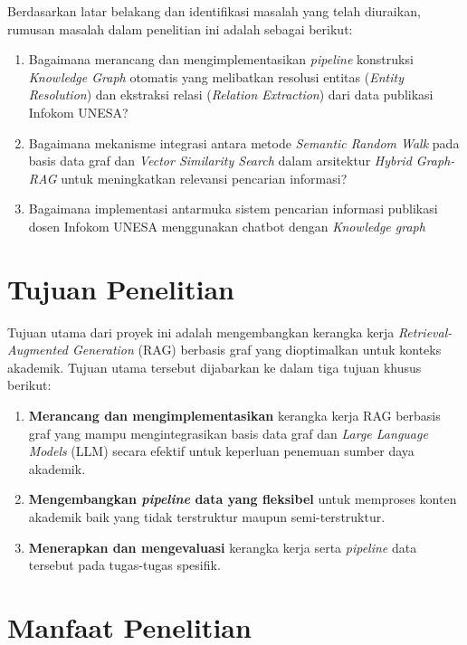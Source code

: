 Berdasarkan latar belakang dan identifikasi masalah yang telah diuraikan, rumusan masalah dalam penelitian ini adalah sebagai berikut:

\begin{enumerate}
    \item Bagaimana merancang dan mengimplementasikan \textit{pipeline} konstruksi \textit{Knowledge Graph} otomatis yang melibatkan resolusi entitas (\textit{Entity Resolution}) dan ekstraksi relasi (\textit{Relation Extraction}) dari data publikasi Infokom UNESA?
    
    \item Bagaimana mekanisme integrasi antara metode \textit{Semantic Random Walk} pada basis data graf dan \textit{Vector Similarity Search} dalam arsitektur \textit{Hybrid Graph-RAG} untuk meningkatkan relevansi pencarian informasi?

    \item Bagaimana implementasi antarmuka sistem pencarian informasi publikasi dosen Infokom UNESA menggunakan chatbot dengan \textit{Knowledge graph}  
\end{enumerate}


\section{Tujuan Penelitian}

Tujuan utama dari proyek ini adalah mengembangkan kerangka kerja \textit{Retrieval-Augmented Generation} (RAG) berbasis graf yang dioptimalkan untuk konteks akademik. Tujuan utama tersebut dijabarkan ke dalam tiga tujuan khusus berikut:

\begin{enumerate}
    \item \textbf{Merancang dan mengimplementasikan} kerangka kerja RAG berbasis graf yang mampu mengintegrasikan basis data graf dan \textit{Large Language Models} (LLM) secara efektif untuk keperluan penemuan sumber daya akademik.
    
    \item \textbf{Mengembangkan \textit{pipeline} data yang fleksibel} untuk memproses konten akademik baik yang tidak terstruktur maupun semi-terstruktur.
    
    \item \textbf{Menerapkan dan mengevaluasi} kerangka kerja serta \textit{pipeline} data tersebut pada tugas-tugas spesifik.
\end{enumerate}

\section{Manfaat Penelitian}

